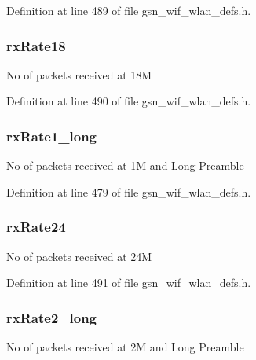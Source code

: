 Definition at line 489 of file gsn\_\-wif\_\-wlan\_\-defs.h.

\hypertarget{a00419_a0b48a9e05659fc40079cf212cf2501b6}{
\subsubsection[{rxRate18}]{ {\bf rxRate18}}}
\label{a00419_a0b48a9e05659fc40079cf212cf2501b6}
No of packets received at 18M 

Definition at line 490 of file gsn\_\-wif\_\-wlan\_\-defs.h.

\hypertarget{a00419_ab9ee3e556b01c109d42c0a5b6121bb90}{
\subsubsection[{rxRate1\_\-long}]{ {\bf rxRate1\_\-long}}}
\label{a00419_ab9ee3e556b01c109d42c0a5b6121bb90}
No of packets received at 1M and Long Preamble 

Definition at line 479 of file gsn\_\-wif\_\-wlan\_\-defs.h.

\hypertarget{a00419_acb883d5793f4e20ab36b0f5a08575eac}{
\subsubsection[{rxRate24}]{ {\bf rxRate24}}}
\label{a00419_acb883d5793f4e20ab36b0f5a08575eac}
No of packets received at 24M 

Definition at line 491 of file gsn\_\-wif\_\-wlan\_\-defs.h.

\hypertarget{a00419_a71f4b1623d813286a889f77e7a79e72a}{
\subsubsection[{rxRate2\_\-long}]{ {\bf rxRate2\_\-long}}}
\label{a00419_a71f4b1623d813286a889f77e7a79e72a}
No of packets received at 2M and Long Preamble 

